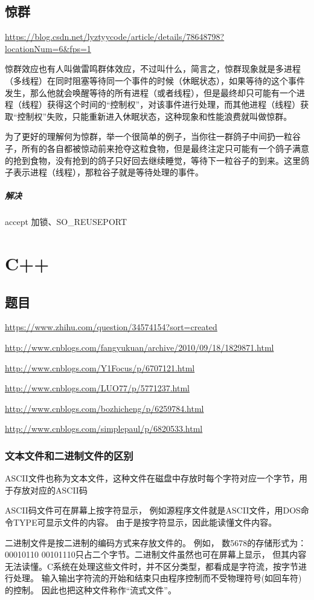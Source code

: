 \documentclass[UTF8,a4paper,8pt]{ctexart}
\begin{document}
 		\subsection{惊群}\url{https://blog.csdn.net/lyztyycode/article/details/78648798?locationNum=6&fps=1}
 			
 			 惊群效应也有人叫做雷鸣群体效应，不过叫什么，简言之，惊群现象就是多进程（多线程）在同时阻塞等待同一个事件的时候（休眠状态），如果等待的这个事件发生，那么他就会唤醒等待的所有进程（或者线程），但是最终却只可能有一个进程（线程）获得这个时间的“控制权”，对该事件进行处理，而其他进程（线程）获取“控制权”失败，只能重新进入休眠状态，这种现象和性能浪费就叫做惊群。
 			 
 			 为了更好的理解何为惊群，举一个很简单的例子，当你往一群鸽子中间扔一粒谷子，所有的各自都被惊动前来抢夺这粒食物，但是最终注定只可能有一个鸽子满意的抢到食物，没有抢到的鸽子只好回去继续睡觉，等待下一粒谷子的到来。这里鸽子表示进程（线程），那粒谷子就是等待处理的事件。
 			 
 			 \subparagraph{解决} accept 加锁、SO\_REUSEPORT

			
\newpage
\section{C++}
	\subsection{题目}
		\url{https://www.zhihu.com/question/34574154?sort=created}
	
		\url{http://www.cnblogs.com/fangyukuan/archive/2010/09/18/1829871.html}
		
		\url{http://www.cnblogs.com/Y1Focus/p/6707121.html}
		
		\url{http://www.cnblogs.com/LUO77/p/5771237.html}
		
		\url{http://www.cnblogs.com/bozhicheng/p/6259784.html}

		\url{http://www.cnblogs.com/simplepaul/p/6820533.html}
		\subsubsection{文本文件和二进制文件的区别}
			ASCII文件也称为文本文件，这种文件在磁盘中存放时每个字符对应一个字节，用于存放对应的ASCII码
			
			ASCII码文件可在屏幕上按字符显示， 例如源程序文件就是ASCII文件，用DOS命令TYPE可显示文件的内容。 由于是按字符显示，因此能读懂文件内容。
			
			二进制文件是按二进制的编码方式来存放文件的。 例如， 数5678的存储形式为： 00010110 00101110只占二个字节。二进制文件虽然也可在屏幕上显示， 但其内容无法读懂。C系统在处理这些文件时，并不区分类型，都看成是字符流，按字节进行处理。 输入输出字符流的开始和结束只由程序控制而不受物理符号(如回车符)的控制。 因此也把这种文件称作“流式文件”。
\end{document}
